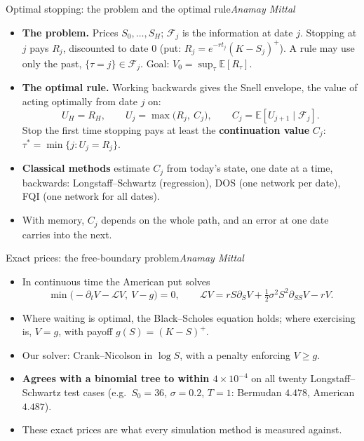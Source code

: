 \documentclass[aspectratio=169,11pt]{beamer}
\newcommand{\by}[1]{\hfill{\normalfont\small\itshape #1}}
\begin{document}
\begin{frame}{Optimal stopping: the problem and the optimal rule\by{Anamay Mittal}}
\begin{itemize}
\item \textbf{The problem.} Prices $S_0,\dots,S_H$; $\mathcal F_j$ is the information at date $j$.
  Stopping at $j$ pays $R_j$, discounted to date 0 (put: $R_j=e^{-rt_j}(K-S_j)^+$).
  A rule may use only the past, $\{\tau=j\}\in\mathcal F_j$. Goal: $V_0=\sup_\tau\mathbb E[R_\tau]$.
\item \textbf{The optimal rule.} Working backwards gives the Snell envelope, the value of acting
  optimally from date $j$ on:
  \[U_H=R_H,\qquad U_j=\max\big(R_j,\ C_j\big),\qquad C_j=\mathbb E[U_{j+1}\mid\mathcal F_j].\]
  Stop the first time stopping pays at least the \textbf{continuation value} $C_j$:
  $\tau^*=\min\{j:U_j=R_j\}$.
\item \textbf{Classical methods} estimate $C_j$ from today's state, one date at a time, backwards:
  Longstaff--Schwartz (regression), DOS (one network per date), FQI (one network for all dates).
\item With memory, $C_j$ depends on the whole path, and an error at one date carries into the next.
\end{itemize}
\end{frame}

\begin{frame}{Exact prices: the free-boundary problem\by{Anamay Mittal}}
\begin{itemize}
\item In continuous time the American put solves
  \[\min\big(-\partial_tV-\mathcal LV,\ V-g\big)=0,\qquad
  \mathcal LV=rS\partial_SV+\tfrac12\sigma^2S^2\partial_{SS}V-rV.\]
\item Where waiting is optimal, the Black--Scholes equation holds; where exercising is, $V=g$,
  with payoff $g(S)=(K-S)^+$.
\item Our solver: Crank--Nicolson in $\log S$, with a penalty enforcing $V\ge g$.
\item \textbf{Agrees with a binomial tree to within $4\times10^{-4}$} on all twenty
  Longstaff--Schwartz test cases (e.g.\ $S_0=36$, $\sigma=0.2$, $T=1$: Bermudan $4.478$,
  American $4.487$).
\item These exact prices are what every simulation method is measured against.
\end{itemize}
\end{frame}
\end{document}
